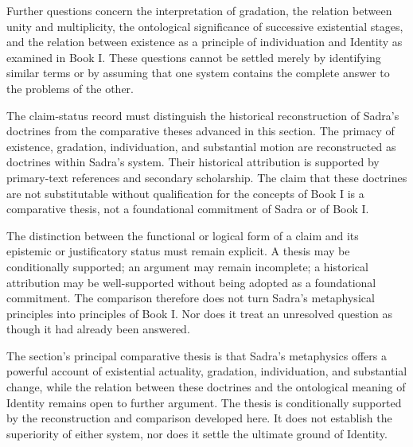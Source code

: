 \label{para:VS.B01.P01.C08.S17.SS19.P002}

Further questions concern
the interpretation
of gradation, the
relation between
unity and multiplicity,
the ontological
significance of
successive existential
stages, and the
relation between
existence as a
principle of individuation
and Identity as
examined in Book I.
These questions
cannot be settled
merely by identifying
similar terms or
by assuming that
one system contains
the complete answer
to the problems
of the other.

\label{para:VS.B01.P01.C08.S17.SS19.P003}

The claim-status record
must distinguish the
historical reconstruction
of Sadra's doctrines
from the comparative
theses advanced in
this section. The
primacy of existence,
gradation, individuation,
and substantial motion
are reconstructed
as doctrines within
Sadra's system. Their
historical attribution
is supported by
primary-text references
and secondary scholarship.
The claim that these
doctrines are not
substitutable without
qualification for
the concepts of
Book I is a
comparative thesis,
not a foundational
commitment of Sadra
or of Book I.

\label{para:VS.B01.P01.C08.S17.SS19.P004}

The distinction between
the functional or
logical form of
a claim and
its epistemic or
justificatory status
must remain explicit.
A thesis may be
conditionally supported;
an argument may
remain incomplete;
a historical attribution
may be well-supported
without being adopted
as a foundational
commitment. The
comparison therefore
does not turn
Sadra's metaphysical
principles into
principles of Book I.
Nor does it
treat an unresolved
question as though
it had already
been answered.

\label{para:VS.B01.P01.C08.S17.SS19.P005}

The section's principal
comparative thesis
is that Sadra's
metaphysics offers
a powerful account
of existential actuality,
gradation, individuation,
and substantial change,
while the relation
between these doctrines
and the ontological
meaning of Identity
remains open to
further argument.
The thesis is
conditionally supported
by the reconstruction
and comparison
developed here.
It does not
establish the
superiority of
either system,
nor does it
settle the
ultimate ground
of Identity.

